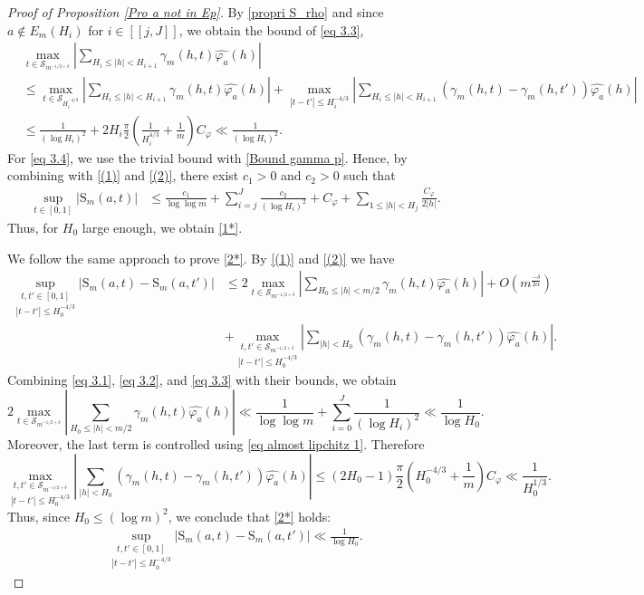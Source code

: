 \documentclass[12pt]{amsart}
\theoremstyle{definition}
\numberwithin{equation}{section}
\numberwithin{equation}{section}
\def\Scal{\mathcal{S}}
\def\B{\mathrm{S}}
\def\Mp{C_\varphi}
\begin{document}
\begin{proof}[Proof of Proposition \ref{Pro a not in Ep}]
By \eqref{propri S_rho} and since $a\not\in E_m(H_i)$ for $i \in [\![ j, J]\!] 
$, we obtain the bound of \eqref{eq 3.3}, 
\begin{align*}&\max_{t\in \Scal_{m^{-1/2+\delta}}} \left|
\sum_{H_i \leq|h|< H_{i+1}}\gamma_m(h,t)\widehat{\varphi_a}(h)
\right|\\
&\leq 
\max _{t\in \Scal_{H_i^{-4/3}}} \left|\sum_{H_i \leq |h|< H_{i+1}} \gamma_m(h,t)\widehat{\varphi_a}(h)\right| +
\max _{|t-t'|\leq H_i^{-4/3}} \left|\sum_{H_i \leq |h|< H_{i+1}} (\gamma_m(h,t)-\gamma_m(h,t'))\widehat{\varphi_a}(h)\right|\\
&\leq 
\frac{1}{(\log H_i)^2} +
2H_i \frac{\pi }{2}\left(\frac{1}{H_i^{4/3}}+\frac{1}{m}\right)
\Mp
\ll  \frac{1}{(\log H_i)^2}.
\end{align*}
For \eqref{eq 3.4}, we use the trivial bound with \eqref{Bound gamma p}.
Hence, by combining with \eqref{(1)} and \eqref{(2)},  there exist $c_1>0$ and $c_2>0$ such that
\begin{align*}
\sup_{t\in [0,1]} \left|\B_m(a,t)\right|
&\leq \frac{c_1}{\log\log m} +{\sum_{i=j}^{J}}
\frac{c_2}{(\log H_i)^2}+ \Mp +
\sum_{1\leq |h|<H_j}\frac{\Mp}{2|h|}
.
\end{align*}
Thus, for $H_0$ large enough, we obtain \eqref{1*}.

We follow the same approach to prove \eqref{2*}. By \eqref{(1)} and \eqref{(2)} we have
\begin{align*}
\underset{|t-t'|\leq H_0^{-4/3}}{\sup_{t,t'\in [0,1]}} \left|\B_m(a,t)-\B_m(a,t')\right|
& \leq
2\max_{t\in \Scal_{m^{-1/2+\delta}}} \left|
\sum_{H_0\leq|h|< m/2}\gamma_m(h,t)\widehat{\varphi_a}(h)
\right| + O\left( m^{\frac{-\delta}{2\alpha}}\right)\\
&+\underset{|t-t'|\leq H_0^{-4/3}}{\max_{t,t'\in \Scal_{m^{-1/2+\delta}}}} \left|
\sum_{|h|<H_0}(\gamma_m(h,t)-\gamma_m(h,t'))\widehat{\varphi_a}(h)
\right|.
\end{align*}
Combining \eqref{eq 3.1}, \eqref{eq 3.2}, and \eqref{eq 3.3} with their bounds, we obtain
$$
2\max_{t\in \Scal_{m^{-1/2+\delta}}} \left|
\sum_{H_0\leq|h|< m/2}\gamma_m(h,t)\widehat{\varphi_a}(h)
\right|
\ll \frac{1}{\log\log m} +{\sum_{i=0}^{J}}
\frac{1}{(\log H_i)^2}\ll  \frac{1}{\log H_0}.
$$
Moreover, the last term is controlled using \eqref{eq almost lipchitz 1}. Therefore
\[
\underset{|t-t'|\leq H_0^{-4/3}}{\max_{t,t'\in \Scal_{m^{-1/2+\delta}}}} \left|
\sum_{|h|<H_0}(\gamma_m(h,t)-\gamma_m(h,t'))\widehat{\varphi_a}(h)
\right|
\leq (2H_0 -1)\frac{\pi}{2}\left(H_0^{-4/3}+\frac{1}{m}\right) \Mp
\ll
\frac{1}{H_0^{1/3}} .
\]
Thus, since $ H_0 \leq (\log m)^2$, we conclude that \eqref{2*} holds:
\begin{align*}
\underset{|t-t'|\leq H_0^{-4/3}}{\sup_{t,t'\in [0,1]}} \left|\B_m(a,t)-\B_m(a,t')\right|
\ll \frac{1}{\log H_0}.
\end{align*}


\end{proof}
\end{document}
